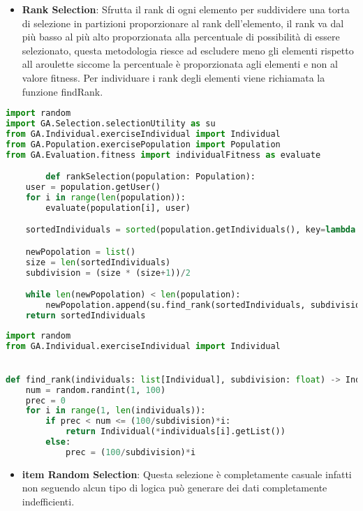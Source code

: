 \documentclass{article}
\begin{document}
\pagebreak

\begin{itemize}
\item\textbf{Rank Selection}: Sfrutta il rank di ogni elemento per suddividere una torta di selezione in partizioni proporzionare al rank dell'elemento, il rank va dal più basso al più alto proporzionata alla percentuale di possibilità di essere selezionato, questa metodologia riesce ad escludere meno gli elementi rispetto all aroulette siccome la percentuale è proporzionata agli elementi e non al valore fitness. Per individuare i rank degli elementi viene richiamata la funzione findRank.
\end{itemize}

\begin{lstlisting}[language=Python, breaklines, no caption]
import random
import GA.Selection.selectionUtility as su
from GA.Individual.exerciseIndividual import Individual
from GA.Population.exercisePopulation import Population
from GA.Evaluation.fitness import individualFitness as evaluate

        def rankSelection(population: Population):
    user = population.getUser()
    for i in range(len(population)):
        evaluate(population[i], user)

    sortedIndividuals = sorted(population.getIndividuals(), key=lambda ind: ind.fitness())

    newPopolation = list()
    size = len(sortedIndividuals)
    subdivision = (size * (size+1))/2

    while len(newPopolation) < len(population):
        newPopolation.append(su.find_rank(sortedIndividuals, subdivision))
    return sortedIndividuals
\end{lstlisting}

        \begin{lstlisting}[language=Python, breaklines, no caption]
            import random
from GA.Individual.exerciseIndividual import Individual


def find_rank(individuals: list[Individual], subdivision: float) -> Individual:
    num = random.randint(1, 100)
    prec = 0
    for i in range(1, len(individuals)):
        if prec < num <= (100/subdivision)*i:
            return Individual(*individuals[i].getList())
        else:
            prec = (100/subdivision)*i
        \end{lstlisting}

\begin{itemize}
\item\textbf{item Random Selection}: Questa selezione è completamente casuale infatti non seguendo alcun tipo di logica può generare dei dati completamente indefficienti.
\end{itemize}
\end{document}

